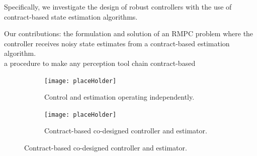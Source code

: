 Specifically, we investigate the design of robust controllers with the use of contract-based state estimation algorithms.

Our contributions: 
the formulation and solution of an RMPC problem where the controller receives noisy state estimates from a contract-based estimation algorithm.
\\
a procedure to make any perception tool chain contract-based 


\begin{figure}[t]
	\centering
	\begin{subfigure}%
		\centering
		\texttt{[image: placeHolder]}
		\label{fig:traditionalCE}
		\caption{Control and estimation operating independently.}		
	\end{subfigure}
	\begin{subfigure}%
		\centering
		\texttt{[image: placeHolder]}
		\label{fig:codesignedCE}
		\caption{Contract-based co-designed controller and estimator.}
	\end{subfigure}
	\label{fig:feedbackloop}
\end{figure}

